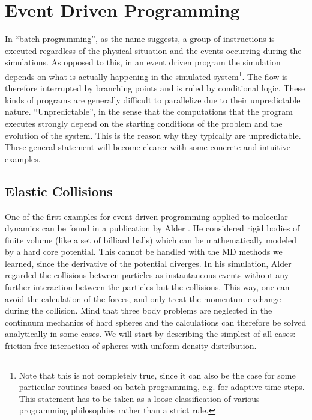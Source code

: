 

\section{Event Driven Programming}


In ``batch programming'', as the name suggests, a group of instructions is executed regardless of the physical situation and the events occurring during the simulations. As opposed to this, in an event driven program the simulation depends on what is actually happening in the simulated system\footnote{Note that this is not completely true, since it can also be the case for some particular routines based on batch programming, e.g. for adaptive time steps. This statement has to be taken as a loose classification of various programming philosophies rather than a strict rule.}. The flow is therefore interrupted by branching points and is ruled by conditional logic. These kinds of programs are generally difficult to parallelize due to their unpredictable nature. ``Unpredictable'', in the sense that the computations that the program executes strongly depend on the starting conditions of the problem and the evolution of the system. This is the reason why they typically are unpredictable. These general statement will become clearer with some concrete and intuitive examples.


\subsection{Elastic Collisions}

One of the first examples for event driven programming applied to molecular dynamics can be found in a publication by Alder  \citep{alder_spheres}. He considered rigid bodies of finite volume (like a set of billiard balls) which can be mathematically modeled by a hard core potential. This cannot be handled with the MD methods we learned, since the derivative of the potential diverges. In his simulation, Alder regarded the collisions between particles as instantaneous events without any further interaction between the particles but the collisions. This way, one can avoid the calculation of the forces, and only treat the momentum exchange during the collision. Mind that three body problems are neglected in the continuum mechanics of hard spheres and the calculations can therefore be solved analytically in some cases. We will start by describing the simplest of all cases: friction-free interaction of spheres with uniform density distribution.

